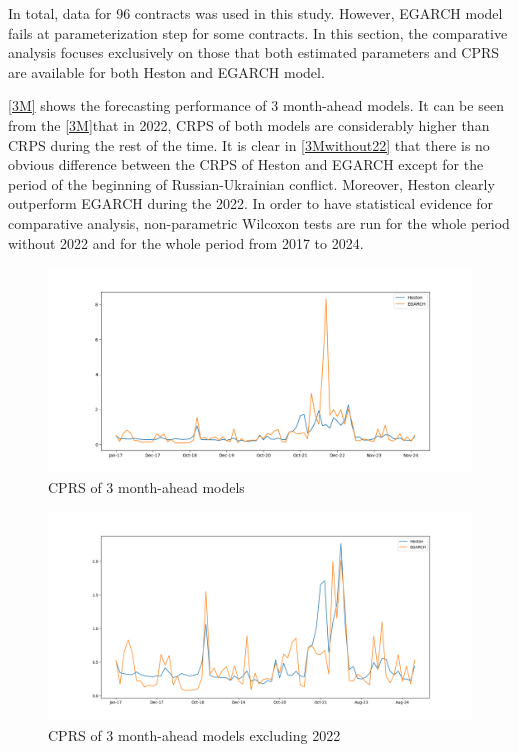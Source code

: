\documentclass[12pt,a4paper]{article}
\newcommand\colorAutoref[1]{{\hypersetup{linkcolor=black}\autoref{#1}}}
\numberwithin{equation}{section}
\begin{document}
 In total, data for 96 contracts was used in this study. However, EGARCH model fails at parameterization step for some contracts. In this section, the comparative analysis focuses exclusively on those that both estimated parameters and CPRS are available for both Heston and EGARCH model.
 
 \colorAutoref{3M} shows the forecasting performance of 3 month-ahead models. It can be seen from the \colorAutoref{3M}that in 2022, CRPS of both models are considerably higher than CRPS during the rest of the time. It is clear in \colorAutoref{3Mwithout22} that there is no obvious difference between the CRPS of Heston and EGARCH except for the period of the beginning of Russian-Ukrainian conflict. Moreover, Heston clearly outperform EGARCH during the 2022. In order to have statistical evidence for comparative analysis, non-parametric Wilcoxon tests are run for the whole period without 2022 and for the whole period from 2017 to 2024. 
 

\begin{figure}[h!] 
\includegraphics[scale=1,width=1\linewidth,height=0.4\textheight]{threemonthahead.png}
\caption{CPRS of 3 month-ahead models}
\label{3M}
\end{figure}

\begin{figure}[h!] 
\includegraphics[scale=1,width=1\linewidth,height=0.4\textheight]{m3_without22.png}
\caption{CPRS of 3 month-ahead models excluding 2022}
\label{3Mwithout22}
\end{figure}
\end{document}
